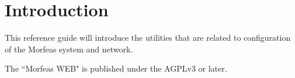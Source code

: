\section{Introduction}
This reference guide will introduce the utilities that are related to configuration of the Morfeas system and network.

The ``Morfeas WEB" is published under the AGPLv3 or later.